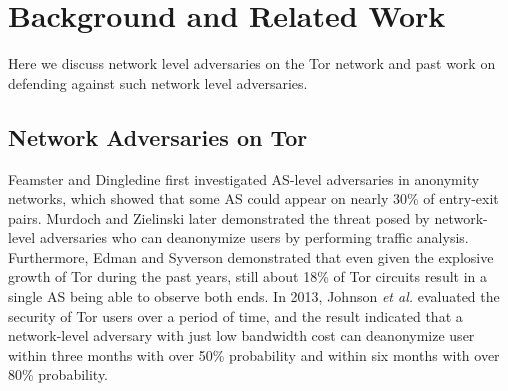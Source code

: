 \section{Background and Related Work}
Here we discuss network level adversaries on the Tor network and past work on defending against such network level adversaries. 

\subsection{Network Adversaries on Tor}
%
Feamster and Dingledine \cite{feamster2004location} first investigated AS-level adversaries in anonymity networks, which showed that some AS could appear on nearly 30\% of entry-exit pairs. Murdoch and Zielinski \cite{murdoch2007sampled} later demonstrated the threat posed by network-level adversaries who can deanonymize users by performing traffic analysis. Furthermore, Edman and Syverson \cite{edman2009awareness} demonstrated that even given the explosive growth of Tor during the past years, still about 18\% of Tor circuits result in a single AS being able to observe both ends. In 2013, Johnson \emph{et al.} \cite{johnson2013users} evaluated the security of Tor users over a period of time, and the result indicated that a network-level adversary with just low bandwidth cost can deanonymize user within three months with over 50\% probability and within six months with over 80\% probability.

